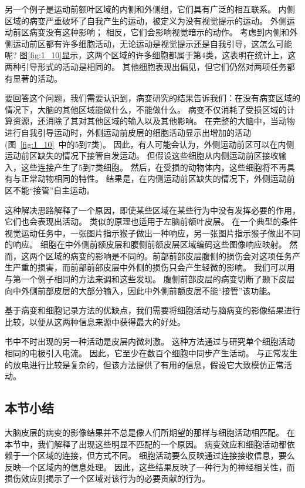 \par
另一个例子是运动前额叶区域的内侧和外侧组，它们具有广泛的相互联系\cite{luppino1993corticocortical}。
内侧区域的病变严重破坏了自我产生的运动，被定义为没有视觉提示的运动。
外侧运动前区病变没有这种影响\cite{thaler1995functions}；
相反，它们会影响视觉暗示的动作。
考虑到内侧和外侧运动前区都有许多细胞活动，无论运动是视觉提示还是自我引导，这怎么可能呢?
图\ref{fig:1_10}显示，这两个区域的许多细胞都属于第4类，这表明在统计上，这两种引导形式的活动是相同的。
其他细胞表现出偏见，但它们仍然对两项任务都有显著的活动。


\par
要回答这个问题，我们需要认识到，病变研究的结果告诉我们：在没有病变区域的情况下，大脑的其他区域能做什么，不能做什么。
病变不仅消耗了受损区域的计算资源，还消除了其对其他区域的输入以及其他影响。
在完整的大脑中，当动物进行自我引导运动时，外侧运动前皮层的细胞活动显示出增加的活动(图~\ref{fig:1_10}~中的5到7类)\cite{mushiake1991neuronal}。
因此，有人可能会认为，外侧运动前区可以在内侧运动前区缺失的情况下接管自发运动。
但假设这些细胞从内侧运动前区接收输入，这些连接产生了5到7类细胞。
然后，在受损的动物体内，这些细胞将不再具有与正常动物相同的特性。
结果是，在内侧运动前区缺失的情况下，外侧运动前区不能“接管”自主运动。


\par
这种解决思路解释了一个原因，即使某些区域在某些行为中没有发挥必要的作用，它们也会表现出活动。
类似的原理也适用于左脑前额叶皮层。
在一个典型的条件视觉运动任务中，一张图片指示猴子做出一种响应，另一张图片指示猴子做出不同的响应。
细胞在中外侧前额皮层和腹侧前额皮层区域编码这些图像响应映射\cite{asaad1998neural}。
然而，这两个区域的病变的影响是不同的。前部前部皮层腹侧的损伤会对这项任务产生严重的损害\cite{wang2000deficit}，而前部前部皮层中外侧的损伤只会产生轻微的影响\cite{petrides2019conditional}。
我们可以用与第一个例子相同的方法来调和这些发现。
腹侧前部皮层的病变切断了颞下皮层向中外侧前部皮层的大部分输入\cite{ungerleider1989projections}，因此中外侧前额皮层不能“接管”该功能。


\par
基于病变和细胞记录方法的优缺点，我们需要将细胞活动与脑病变的影像结果进行比较，以便从这两种信息来源中获得最大的好处。
\par
书中不时出现的另一种活动是皮层内微刺激。
这种方法通过与研究单个细胞活动相同的电极引入电流。
因此，它至少在数百个细胞中同步产生活动。
与正常发生的放电进行比较是复杂的，但该方法提供了有用的信息，假设它大致模仿正常活动。


\subsection{本节小结}
大脑皮层的病变的影像结果并不总是像人们所期望的那样与细胞活动相匹配。
在本节中，我们解释了出现这些明显不匹配的一个原因。
病变效应和细胞活动都依赖于一个区域的连接，但方式不同。
细胞活动要么反映通过连接接收信息，要么反映一个区域内的信息处理。
因此，这些结果反映了一种行为的神经相关性，而损伤效应则揭示了一个区域对该行为的必要贡献的行为。


